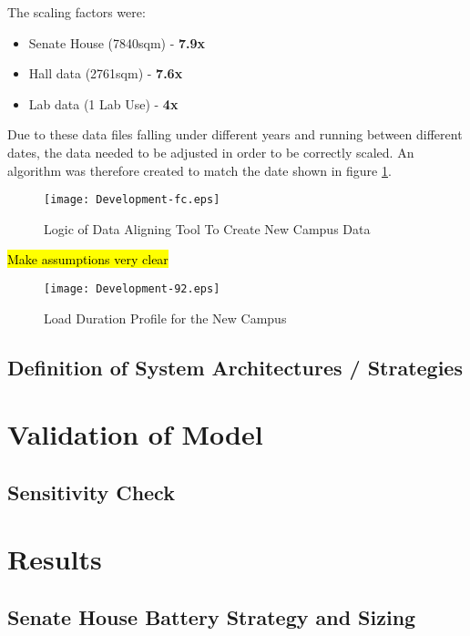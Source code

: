 The scaling factors were:

\begin{itemize}
\tightlist
\item
  Senate House (7840sqm) - \textbf{7.9x}
\item
  Hall data (2761sqm) - \textbf{7.6x}
\item
  Lab data (1 Lab Use) - \textbf{4x}
\end{itemize}

Due to these data files falling under different years and running
between different dates, the data needed to be adjusted in order to be
correctly scaled. An algorithm was therefore created to match the date
shown in figure \ref{Development-fc}.

\begin{figure}[H]
 \centering
 \texttt{[image: Development-fc.eps]}
 \caption{Logic of Data Aligning Tool To Create New Campus Data}
 \label{Development-fc}
 \end{figure}

\hl{Make assumptions very clear}

\begin{figure}[H]
 \centering
 \texttt{[image: Development-92.eps]}
 \caption{Load Duration Profile for the New Campus}
 \label{Development-92}
 \end{figure}

\subsection{Definition of System Architectures /
Strategies}\label{definition-of-system-architectures-strategies}

\section{Validation of Model}\label{validation-of-model}

\subsection{Sensitivity Check}\label{sensitivity-check}

\section{Results}\label{results}

\subsection{Senate House Battery Strategy and
Sizing}\label{senate-house-battery-strategy-and-sizing}


